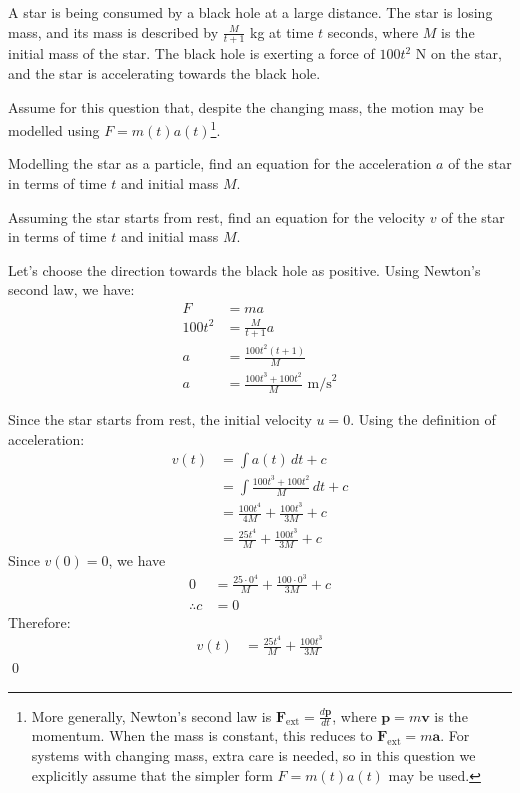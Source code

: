 \begin{example}
    A star is being consumed by a black hole at a large distance. The star is losing mass, and its mass is described by $\frac{M}{t+1}$ kg at time $t$ seconds, where $M$ is the initial mass of the star. The black hole is exerting a force of $100t^2$ N on the star, and the star is accelerating towards the black hole.

    Assume for this question that, despite the changing mass, the motion may be modelled using $F = m(t)a(t)$\footnote{More generally, Newton's second law is $\mathbf{F}_{\mathrm{ext}} = \frac{d\mathbf{p}}{dt}$, where $\mathbf{p} = m\mathbf{v}$ is the momentum. When the mass is constant, this reduces to $\mathbf{F}_{\mathrm{ext}} = m\mathbf{a}$. For systems with changing mass, extra care is needed, so in this question we explicitly assume that the simpler form $F = m(t)a(t)$ may be used.}.

    Modelling the star as a particle, find an equation for the acceleration $a$ of the star in terms of time $t$ and initial mass $M$.

    Assuming the star starts from rest, find an equation for the velocity $v$ of the star in terms of time $t$ and initial mass $M$.
\end{example}

\begin{solution}
Let's choose the direction towards the black hole as positive. Using Newton's second law, we have:
\begin{align*}
    F &= ma \\
    100t^2 &= \frac{M}{t+1}a \\
    a &= \frac{100t^2(t+1)}{M} \\
    a &= \frac{100t^3 + 100t^2}{M} \text{ m/s}^2
\end{align*}

Since the star starts from rest, the initial velocity $u = 0$. Using the definition of acceleration:
\begin{align*}
    v(t) &= \int a(t) \, dt + c \\
    &= \int\frac{100t^3 + 100t^2}{M} \, dt + c \\
     &= \frac{100t^4}{4M} + \frac{100t^3}{3M} + c \\
     &= \frac{25t^4}{M} + \frac{100t^3}{3M} + c
\end{align*}
Since $v(0) = 0$, we have 
\begin{align*}
    0 &= \frac{25 \cdot 0^4}{M} + \frac{100 \cdot 0^3}{3M} + c \\
    \therefore c &= 0
\end{align*}
Therefore:
\begin{align*}
    v(t) &= \frac{25t^4}{M} + \frac{100t^3}{3M}
\end{align*}
\qed

\end{solution}

